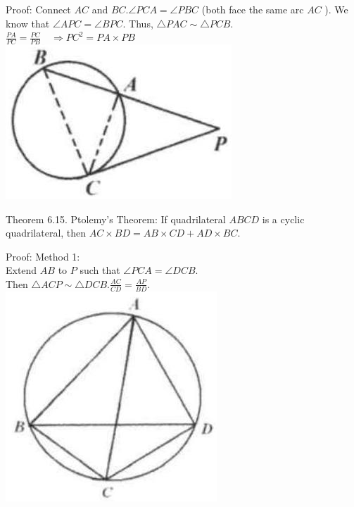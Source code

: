 \documentclass[10pt]{article}
\begin{document}
Proof:
Connect \(A C\) and \(B C . \angle P C A=\angle P B C\) (both face the same arc \(A C\) ). We know that \(\angle A P C=\angle B P C\). Thus, \(\triangle P A C \sim \triangle P C B\).\\
\(\frac{P A}{P C}=\frac{P C}{P B} \quad \Rightarrow P C^{2}=P A \times P B\)\\
\includegraphics[max width=\textwidth, center]{2025_04_17_97bc1f7e44d93c271a88g-193}

Theorem 6.15. Ptolemy's Theorem: If quadrilateral \(A B C D\) is a cyclic quadrilateral, then \(A C \times B D=A B \times C D+A D \times B C\).

Proof:
Method 1:\\
Extend \(A B\) to \(P\) such that \(\angle P C A=\angle D C B\).\\
Then \(\triangle A C P \sim \triangle D C B . \frac{A C}{C D}=\frac{A P}{B D}\).\\
\includegraphics[max width=\textwidth, center]{2025_04_17_97bc1f7e44d93c271a88g-193(2)}
\end{document}
